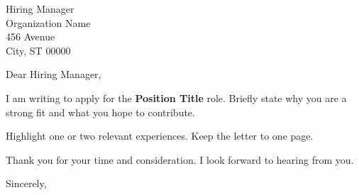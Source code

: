 \documentclass[11pt]{letter}
\begin{document}
\begin{letter}{Hiring Manager \\
  Organization Name \\
  456 Avenue \\
  City, ST 00000}

\opening{Dear Hiring Manager,}

I am writing to apply for the \textbf{Position Title} role. Briefly state why
you are a strong fit and what you hope to contribute.

Highlight one or two relevant experiences. Keep the letter to one page.

Thank you for your time and consideration. I look forward to hearing from you.

\closing{Sincerely,}

\end{letter}
\end{document}
